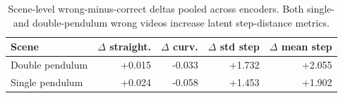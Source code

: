 \begin{table}[t]
\centering
\caption{Scene-level wrong-minus-correct deltas pooled across encoders. Both single- and double-pendulum wrong videos increase latent step-distance metrics.}
\label{tab:sim-scene-deltas}
\small
\begin{tabular}{lrrrr}
\toprule
Scene & $\Delta$ straight. & $\Delta$ curv. & $\Delta$ std step & $\Delta$ mean step \\
\midrule
Double pendulum & +0.015 & -0.033 & +1.732 & +2.055 \\
Single pendulum & +0.024 & -0.058 & +1.453 & +1.902 \\
\bottomrule
\end{tabular}
\end{table}
